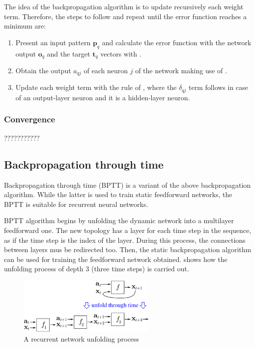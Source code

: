 The idea of the backpropagation algorithm is to update recursively each weight term.
Therefore, the steps to follow and repeat until the error function reaches a minimum are:
\begin{enumerate}
\item Present an input pattern $\mathbf{p}_{q}$ and calculate the error function with the network output $\mathbf{o}_{q}$ and the target $\mathbf{t}_{q}$ vectors with .
\item Obtain the output $a_{qj}$ of each neuron $j$ of the network making use of .
\item Update each weight term with the rule of , where the $\delta_{qj}$ term follows  in case of an output-layer neuron and  it is a hidden-layer neuron.
\end{enumerate}


\subsubsection{Convergence}
\label{subsubsec:backpropconvergence}
???????????


\subsection{Backpropagation through time}
\label{subsec:bptt}
Backpropagation through time (BPTT) is a variant of the above backpropagation algorithm. While the latter is used to train static feedforward networks, the BPTT is suitable for recurrent neural networks.

BPTT algorithm begins by unfolding the dynamic network into a multilayer feedforward one. The new topology has a layer for each time step in the sequence, as if the time step is the index of the layer. During this process, the connections between layers mus be redirected too. Then, the static backpropagation algorithm can be used for training the feedforward network obtained. 
 shows how the unfolding process of depth $3$ (three time steps) is carried out.

\begin{figure}[!ht]
\centering
\includegraphics[width=0.6\textwidth]{images/unfoldOverTime.png}
\caption{A recurrent network unfolding process}
\label{fig:bpttunfolding}
\end{figure}

